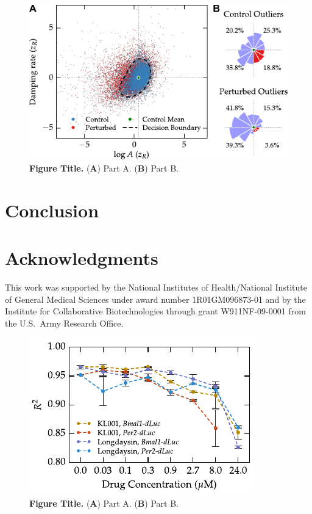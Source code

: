\documentclass[11pt, letterpaper]{article}
\newcommand{\beginsupplement}{%
        \setcounter{table}{0}
        \renewcommand{\thetable}{S\arabic{table}}%
        \setcounter{figure}{0}
        \renewcommand{\thefigure}{S\arabic{figure}}%
     }
\begin{document}
\begin{figure}[tbp]
  \begin{center}
    \includegraphics[]{figures/pdfs/outliers.pdf}
  \end{center}
  \caption{{\bfseries Figure Title.}
({\bfseries A}) Part A.
({\bfseries B}) Part B.}
\label{fig:outlier_dist}
\end{figure}




\section*{Conclusion}

\section*{Acknowledgments}
This work was supported by the National Institutes of Health/National Institute of General Medical Sciences under award number 1R01GM096873-01 and by the Institute for Collaborative Biotechnologies through grant W911NF-09-0001 from the U.S.\ Army Research Office.





\beginsupplement

\begin{figure}[tbp]
  \begin{center}
    \includegraphics[]{figures/pdfs/small_molecule_r2.pdf}
  \end{center}
  \caption{{\bfseries Figure Title.}
({\bfseries A}) Part A.
({\bfseries B}) Part B.}
\label{fig:small_molecule_r2}
\end{figure}
\end{document}
